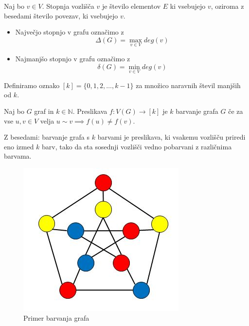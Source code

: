 \documentclass[mat1]{fmfdelo}
\begin{document}
\begin{definicija}
    Naj bo $v\in V$. Stopnja vozlišča $v$ je število elementov $E$ ki vsebujejo $v$, oziroma z besedami število povezav, ki vsebujejo $v$. 
\end{definicija}

\begin{itemize}
    \item Največjo stopnjo v grafu označimo z \[\Delta (G) = \max_{v\in V} deg(v)\]
    \item Najmanjšo stopnjo v grafu označimo z \[\delta (G) = \min_{v\in V} deg(v)\]
\end{itemize}

\begin{definicija}
    Definiramo oznako $[k] = \{0, 1, 2, \dots, k-1\}$ za množico naravnih števil manjših od $k$.
\end{definicija}

\begin{definicija}
    Naj bo $G$ graf in $k\in \mathbb{N}$. Preslikava $f:V(G)\to [k]$ je $k$ barvanje grafa $G$ če za vse $u, v\in V$ velja $u\sim v \implies f(u)\neq f(v)$.
\end{definicija}
Z besedami: barvanje grafa s $k$ barvami je preslikava, ki vsakemu vozlišču priredi eno izmed $k$ barv, tako da sta sosednji vozlišči vedno pobarvani z različnima barvama.
\begin{figure}[H]
    \begin{center}
    \includegraphics[scale=0.5]{assets/coloring}
    \caption{Primer barvanja grafa}
    \label{slika2}
    \end{center}
    \end{figure}
    
\end{document}
